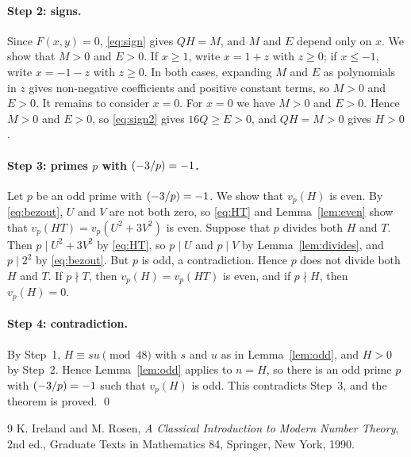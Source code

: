 \documentclass[11pt]{article}
\newcommand{\leg}[2]{\mathchoice{\biggl(\dfrac{#1}{#2}\biggr)}{(#1/#2)}{(#1/#2)}{(#1/#2)}}
\begin{document}
\paragraph{Step 2: signs.} Since $F(x,y)=0$, \eqref{eq:sign} gives $QH=M$, and $M$ and $E$ depend only on $x$. We show that $M>0$ and $E>0$. If $x\geq1$, write $x=1+z$ with $z\geq0$; if $x\leq-1$, write $x=-1-z$ with $z\geq0$. In both cases, expanding $M$ and $E$ as polynomials in $z$ gives non-negative coefficients and positive constant terms, so $M>0$ and $E>0$. It remains to consider $x=0$. For $x=0$ we have $M>0$ and $E>0$. Hence $M>0$ and $E>0$, so \eqref{eq:sign2} gives $16Q\geq E>0$, and $QH=M>0$ gives $H>0$.

\paragraph{\texorpdfstring{Step 3: primes $p$ with $\leg{-3}{p}=-1$.}{Step 3: inert primes.}} Let $p$ be an odd prime with $\leg{-3}{p}=-1$. We show that $v_p(H)$ is even. By \eqref{eq:bezout}, $U$ and $V$ are not both zero, so \eqref{eq:HT} and Lemma~\ref{lem:even} show that $v_p(HT)=v_p(U^2+3V^2)$ is even. Suppose that $p$ divides both $H$ and $T$. Then $p\mid U^2+3V^2$ by \eqref{eq:HT}, so $p\mid U$ and $p\mid V$ by Lemma~\ref{lem:divides}, and $p\mid 2^{2}$ by \eqref{eq:bezout}. But $p$ is odd, a contradiction. Hence $p$ does not divide both $H$ and $T$. If $p\nmid T$, then $v_p(H)=v_p(HT)$ is even, and if $p\nmid H$, then $v_p(H)=0$.

\paragraph{Step 4: contradiction.} By Step~1, $H\equiv su\pmod{48}$ with $s$ and $u$ as in Lemma~\ref{lem:odd}, and $H>0$ by Step~2. Hence Lemma~\ref{lem:odd} applies to $n=H$, so there is an odd prime $p$ with $\leg{-3}{p}=-1$ such that $v_p(H)$ is odd. This contradicts Step~3, and the theorem is proved.
\qed

\begin{thebibliography}{9}
 K. Ireland and M. Rosen, \emph{A Classical Introduction to Modern Number Theory}, 2nd ed., Graduate Texts in Mathematics 84, Springer, New York, 1990.
\end{thebibliography}
\end{document}
